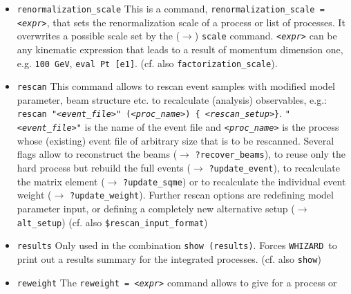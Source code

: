 \documentclass[12pt]{book}
\newcommand{\ttt}[1]{\texttt{#1}}
\newcommand{\whizard}{\ttt{WHIZARD}}
\begin{document}
\begin{itemize}
definition of a tuple of points for a histogram or an \ttt{eval}
constructor that tells \whizard\ e.g. by which rule to calculate an
observable to be stored in the record \ttt{record\_name}. Example:
\ttt{record h (12)} is a record for a histogram defined under the name
\ttt{h} with the single data point (bin) at value 12; \ttt{record rap1
(eval Rap [e1])} defines a record with name \ttt{rap1} which has an
evaluator to calculate the rapidity (predefined \whizard\ function) of
an outgoing electron.
(cf. also \ttt{eval}, \ttt{histogram}, \ttt{plot})
\item
\ttt{renormalization\_scale} \newline
This is a command, \ttt{renormalization\_scale = {\em <expr>}}, that sets
the renormalization scale of a process or list of processes. It
overwrites a possible scale set by the ($\to$) \ttt{scale} command.
\ttt{{\em <expr>}} can be any kinematic expression that leads to a result of
momentum dimension one, e.g. \ttt{100 GeV}, \ttt{eval
Pt [e1]}. (cf. also \ttt{factorization\_scale}).
\item
\ttt{rescan} \newline
This command allows to rescan event samples with modified model
parameter, beam structure etc. to recalculate (analysis) observables,
e.g.: \newline
\ttt{rescan "{\em <event\_file>}" ({\em <proc\_name>}) \{ {\em <rescan\_setup>}\}}.
\newline
\ttt{"{\em <event\_file>}"} is the name of the event file and
\ttt{{\em <proc\_name>}} is the process whose (existing) event
file of arbitrary size that is to be rescanned. Several flags allow to
reconstruct the beams ($\to$ \ttt{?recover\_beams}), to reuse only the
hard process but rebuild the full events ($\to$
\ttt{?update\_event}), to recalculate the matrix element ($\to$
\ttt{?update\_sqme}) or to recalculate the individual event weight ($\to$
\ttt{?update\_weight}). Further rescan options are redefining model
parameter input, or defining a completely new alternative setup ($\to$
\ttt{alt\_setup}) (cf. also \ttt{\$rescan\_input\_format})
\item
\ttt{results} \newline
Only used in the combination \ttt{show (results)}. Forces \whizard\ to
print out a results summary for the integrated processes.
(cf. also \ttt{show})
\item
\ttt{reweight} \newline
The \ttt{reweight = {\em <expr>}} command allows to give for a process or

\end{itemize}
\end{document}
